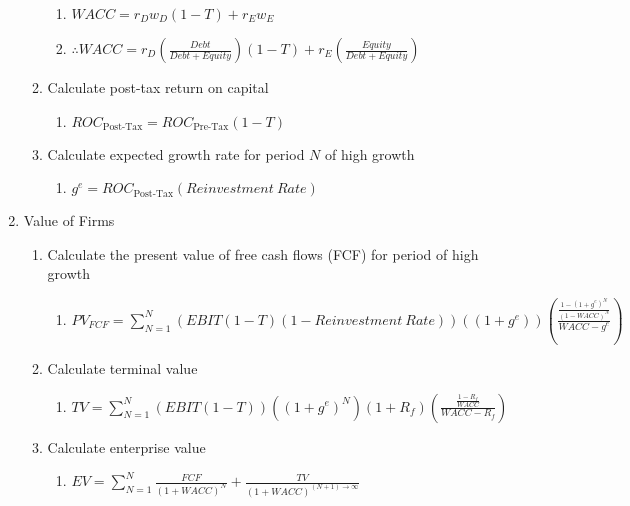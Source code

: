 \documentclass[11pt, english]{article}
\begin{document}
\begin{enumerate}
\begin{enumerate}
\begin{enumerate}
                                \item $WACC=r_Dw_D(1-T)+r_Ew_E$
                                \item $\therefore WACC=r_D\left(\frac{Debt}{Debt+Equity}\right)(1-T)+r_E\left(\frac{Equity}{Debt+Equity}\right)$
                        \end{enumerate}
                        \item Calculate post-tax return on capital
                        \begin{enumerate}
                                \item $ROC_{\textrm{Post-Tax}}=ROC_{\textrm{Pre-Tax}}(1-T)$
                        \end{enumerate}
                        \item Calculate expected growth rate for period $N$ of high growth
                        \begin{enumerate}
                                \item $g^e=ROC_{\textrm{Post-Tax}}(Reinvestment\ Rate)$
                        \end{enumerate}
                \end{enumerate}
                \item Value of Firms
                \begin{enumerate}
                        \item Calculate the present value of free cash flows (FCF) for period of high growth 
                        \begin{enumerate}
                                \item $PV_{FCF}=\sum_{N=1}^N(EBIT(1-T)(1-Reinvestment\ Rate))((1+g^e))\left(\frac{\frac{1-(1+g^e)^N}{(1-WACC)^N}}{WACC-g^e}\right)$
                        \end{enumerate}
                        \item Calculate terminal value
                        \begin{enumerate}
                                \item $TV=\sum_{N=1}^N(EBIT(1-T))((1+g^e)^N)(1+R_f)\left(\frac{\frac{1-R_f}{WACC}}{WACC-R_f}\right)$
                        \end{enumerate}
                        \item Calculate enterprise value
                        \begin{enumerate}
                                \item $EV=\sum_{N=1}^N\frac{FCF}{(1+WACC)^N}+\frac{TV}{(1+WACC)^{(N+1)\longrightarrow\infty}}$

\end{enumerate}
\end{enumerate}
\end{enumerate}
\end{document}
